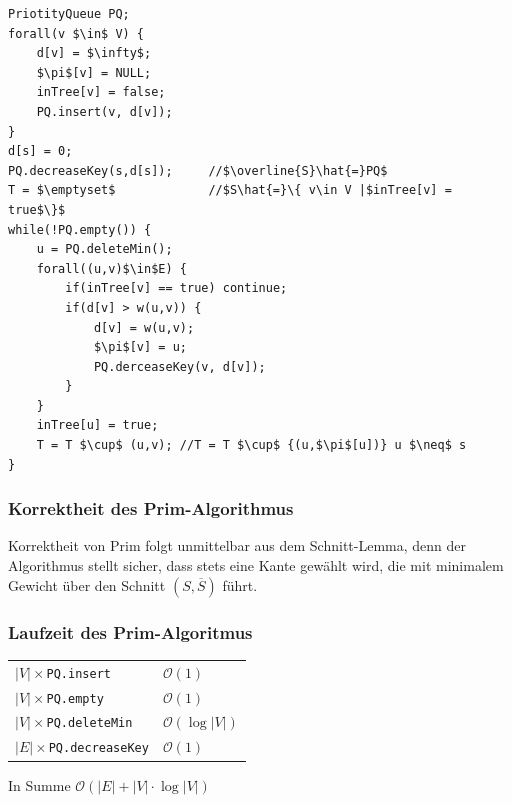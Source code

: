 \begin{lstlisting}
PriotityQueue PQ;
forall(v $\in$ V) {
	d[v] = $\infty$;
	$\pi$[v] = NULL;
	inTree[v] = false;
	PQ.insert(v, d[v]);
}
d[s] = 0;
PQ.decreaseKey(s,d[s]);		//$\overline{S}\hat{=}PQ$
T = $\emptyset$				//$S\hat{=}\{ v\in V |$inTree[v] = true$\}$
while(!PQ.empty()) {
	u = PQ.deleteMin();
	forall((u,v)$\in$E) {
		if(inTree[v] == true) continue;
		if(d[v] > w(u,v)) {
			d[v] = w(u,v);
			$\pi$[v] = u;
			PQ.derceaseKey(v, d[v]);
		}
	}
	inTree[u] = true;
	T = T $\cup$ (u,v);	//T = T $\cup$ {(u,$\pi$[u])} u $\neq$ s
}
\end{lstlisting}
\subsubsection{Korrektheit des Prim-Algorithmus}
Korrektheit von Prim folgt unmittelbar aus dem Schnitt-Lemma, denn der Algorithmus stellt sicher, dass stets eine Kante gewählt wird, die mit minimalem Gewicht über den Schnitt $(S,\overline{S})$ führt.
\subsubsection{Laufzeit des Prim-Algoritmus}
\begin{tabular}{ll}
	$|V|\times$\texttt{PQ.insert}&$\mathcal{O}(1)$\\
	$|V|\times$\texttt{PQ.empty}&$\mathcal{O}(1)$\\
	$|V|\times$\texttt{PQ.deleteMin}&$\mathcal{O}(\log|V|)$\\
	$|E|\times$\texttt{PQ.decreaseKey}&$\mathcal{O}(1)$
\end{tabular}
In Summe $\mathcal{O}(|E|+|V|\cdot\log|V|)$